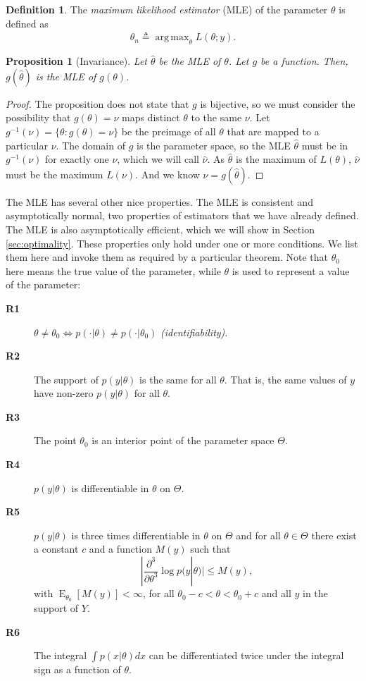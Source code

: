 \documentclass{book}
\theoremstyle{plain}%
\newtheorem{proposition}{Proposition}[section]
\theoremstyle{definition}
\newtheorem{definition}{Definition}[section]
\DeclareMathOperator{\E}{E}
\newlength{\arrow}
\DeclareMathOperator*{\argmax}{arg\,max}
\begin{document}
\begin{definition}
The \textit{maximum likelihood estimator} (MLE) of the parameter $\theta$ is defined as $$\hat{\theta}_n \triangleq \displaystyle\argmax_\theta L(\theta;y).$$
\end{definition}

\begin{proposition}[Invariance]
Let $\hat{\theta}$ be the MLE of $\theta$. Let $g$ be a function. Then, $g(\hat{\theta})$ is the MLE of $g(\theta)$.
\end{proposition}

\begin{proof}
The proposition does not state that $g$ is bijective, so we must consider the possibility that $g(\theta) = \nu$ maps distinct $\theta$ to the same $\nu$. Let $g^{-1}(\nu) = \{\theta: g(\theta) = \nu\}$ be the preimage of all $\theta$ that are mapped to a particular $\nu$. The domain of $g$ is the parameter space, so the MLE $\hat{\theta}$ must be in $g^{-1}(\nu)$ for exactly one $\nu$, which we will call $\hat{\nu}$. As $\hat{\theta}$ is the maximum of $L(\theta)$, $\hat{\nu}$ must be the maximum $L(\nu)$. And we know $\hat{\nu} = g(\hat{\theta})$.
\end{proof}

The MLE has several other nice properties. The MLE is consistent and asymptotically normal, two properties of estimators that we have already defined. The MLE is also asymptotically efficient, which we will show in Section \ref{sec:optimality}. These properties only hold under one or more conditions. We list them here and invoke them as required by a particular theorem. Note that $\theta_0$ here means the true value of the parameter, while $\theta$ is used to represent a value of the parameter:

\begin{description}
\item[\textbf{R1}] $\theta \neq \theta_0 \Leftrightarrow p(\cdot|\theta) \neq p(\cdot|\theta_0)$ \emph{(identifiability)}.
\item[\textbf{R2}] The support of $p(y|\theta)$ is the same for all $\theta$. That is, the same values of $y$ have non-zero $p(y|\theta)$ for all $\theta$.
\item[\textbf{R3}] The point $\theta_0$ is an interior point of the parameter space $\Theta$.
\item[\textbf{R4}] $p(y|\theta)$ is differentiable in $\theta$ on $\Theta$.
\item[\textbf{R5}] $p(y|\theta)$ is three times differentiable in $\theta$ on $\Theta$ and for all $\theta \in \Theta$ there exist a constant $c$ and a function $M(y)$ such that $$|\frac{\partial^3}{\partial \theta^3} \log p(y|\theta)| \leq M(y),$$
with $\E_{\theta_0}[M(y)] < \infty$, for all $\theta_0 - c < \theta < \theta_0 + c$ and all $y$ in the support of $Y$.
\item[\textbf{R6}] The integral $\int p(x|\theta)dx$ can be differentiated twice under the integral sign as a function of $\theta$.
\end{description}
\end{document}
